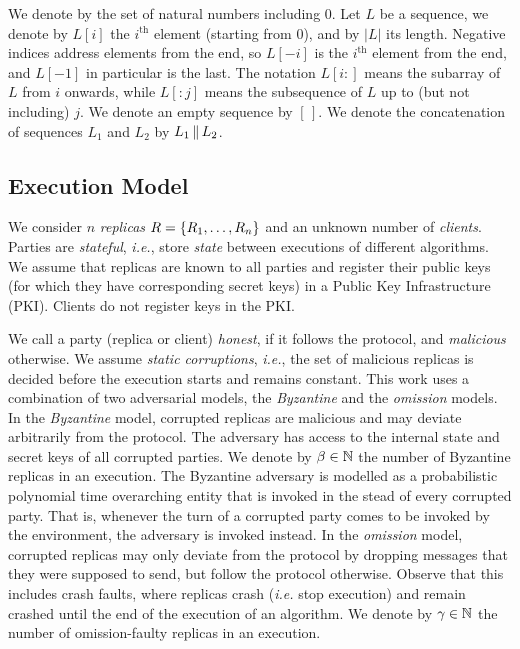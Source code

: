 
We denote by \BN the set of natural numbers including $0$.
Let $L$ be a sequence, we denote by $L[i]$ the $i^\text{th}$ element (starting from $0$),
and by $|L|$ its length.
Negative indices address elements from the end, so $L[-i]$ is the $i^\text{th}$ element from
the end, and $L[-1]$ in particular is the last.
The notation $L[i{:}]$ means the
subarray of $L$ from $i$ onwards, while $L[{:}j]$ means the subsequence of $L$ up to (but not including) $j$.
We denote an empty sequence by $[\,]$.
We denote the concatenation of sequences $L_1$ and $L_2$ by $L_1 \,\|\, L_2$.

\subsection{Execution Model}\label{sec:system}

We consider $n$ \emph{replicas} $R=\{R_1,\ldots,R_n\}$ and an unknown number of \emph{clients}. Parties are \emph{stateful}, \textit{i.e.}, store \emph{state} between executions of different algorithms.
We assume that replicas are known to all parties and register their public keys (for which they have corresponding secret keys) in a Public Key Infrastructure (PKI). Clients do not register keys in the PKI.

We call a party (replica or client) \emph{honest}, if it follows the protocol, and \emph{malicious} otherwise.
We assume \emph{static corruptions},  \textit{i.e.}, the set of malicious replicas is decided before the execution starts and remains constant.
This work uses a combination of two adversarial models, the \emph{Byzantine} and the \emph{omission} models.
In the \emph{Byzantine} model, corrupted replicas are malicious and may deviate arbitrarily from the protocol. The adversary has access to the internal state and secret keys of all corrupted parties. We denote by $\beta \in \BN$ the  number of Byzantine replicas in an execution.
The Byzantine adversary is modelled as a probabilistic polynomial time overarching entity that is invoked in the stead of every corrupted party.
That is, whenever the turn of a corrupted party comes to be invoked by the environment, the adversary is invoked instead.
In the \emph{omission} model, corrupted replicas may only deviate from the protocol by dropping messages that they were supposed to send, but follow the protocol otherwise. Observe that this includes crash faults, where replicas crash (\textit{i.e.} stop execution) and remain crashed until the end of the execution of an algorithm. We denote by $\gamma \in \BN$ the number of omission-faulty replicas in an execution.

